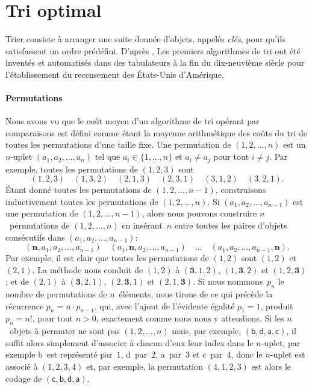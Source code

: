 \section{Tri optimal}
\label{sec_opt_sort}

Trier consiste à arranger une suite donnée d'objets, appelés
\emph{clés}, pour qu'ils satisfassent un ordre
prédéfini. D'après \cite{Knuth_1998}, Les premiers algorithmes de tri
ont été inventés et automatisés dans des tabulateurs à la fin du
dix-neuvième siècle pour l'établissement du recensement des États-Unis
d'Amérique.

\paragraph{Permutations}
\label{par_permutations}

\hspace*{-10pt} Nous avons vu  que le coût
moyen d'un algorithme de tri opérant par comparaisons est défini comme
étant la moyen\-ne arithmétique des coûts du tri de toutes les
permutations d'une taille fixe. Une permutation de \((1,2,\dots,n)\)
est un \(n\)-uplet \((a_1,a_2,\dots,a_n)\) tel que \(a_i \in
\{1,\dots,n\}\) et \({a_i \neq a_j}\) pour tout \({i \neq j}\). Par
exemple, toutes les permutations de \((1,2,3)\) sont
\begin{equation*}
(1,2,3) \quad (1,3,2) \quad (2,1,3) \quad (2,3,1) \quad (3,1,2) \quad
(3,2,1).
\end{equation*}
Étant donné toutes les permutations de \((1,2,\dots,n-1)\),
construisons inductivement toutes les permutations de
\((1,2,\dots,n)\). Si \((a_1,a_2,\dots,a_{n-1})\) est une permutation
de \((1,2,\dots,n-1)\), alors nous pouvons construire
\(n\)~permutations de \((1,2,\dots,n)\) en insérant~\(n\) entre toutes
les paires d'objets consécutifs dans \((a_1,a_2,\dots,a_{n-1})\):
\begin{equation*}
(\boldsymbol{n},a_1,a_2,\dots,a_{n-1})\quad
(a_1,\boldsymbol{n},a_2,\dots,a_{n-1})\quad \ldots \quad
(a_1,a_2,\dots,a_{n-1},\boldsymbol{n}).
\end{equation*}
Par exemple, il est clair que toutes les permutations de \((1,2)\)
sont \((1,2)\) et \((2,1)\). La méthode nous conduit de \((1,2)\) à
\((\boldsymbol{3},1,2)\), \((1,\boldsymbol{3},2)\) et
\((1,2,\boldsymbol{3})\); et de \((2,1)\) à \((\boldsymbol{3},2,1)\),
\((2,\boldsymbol{3},1)\) et \((2,1,\boldsymbol{3})\). Si nous
nommons~\(p_n\) le nombre de permutations de \(n\)~éléments, nous
tirons de ce qui précède la récurrence \(p_n = n \cdot p_{n-1}\), qui,
avec l'ajout de l'évidente égalité \(p_1 = 1\), produit \(p_n = n!\),
pour tout \({n > 0}\), exactement comme nous nous y attendions. Si les
\(n\)~objets à permuter ne sont pas \((1,2,\dots,n)\) mais, par
exemple, \((\textsf{b},\textsf{d},\textsf{a},\textsf{c})\), il suffit
alors simplement d'associer à chacun d'eux leur index dans le
\(n\)-uplet, par exemple \textsf{b}~est représenté par~\(1\),
\textsf{d}~par~\(2\), \textsf{a}~par~\(3\) et \textsf{c}~par~\(4\),
donc le \(n\)-uplet est associé à \((1,2,3,4)\) et, par exemple, la
permutation \((4,1,2,3)\) est alors le codage de
\((\textsf{c},\textsf{b},\textsf{d},\textsf{a})\).

